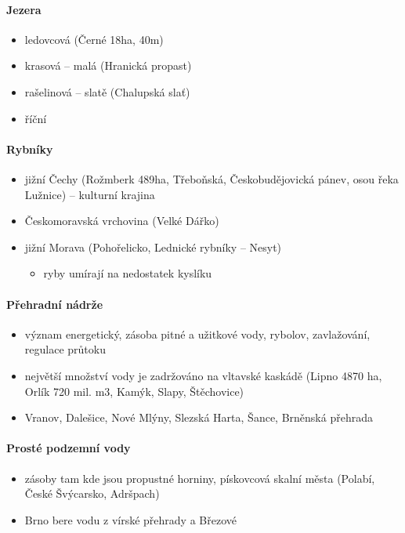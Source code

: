 \paragraph{Jezera}
\begin{itemize}
\item ledovcová (Černé 18ha, 40m)
\item krasová -- malá (Hranická propast)
\item rašelinová -- slatě (Chalupská slať)
\item říční	
\end{itemize}

\paragraph{Rybníky}
\begin{itemize}
\item jižní Čechy (Rožmberk 489ha, Třeboňská, Českobudějovická pánev, osou řeka Lužnice) -- kulturní krajina
\item Českomoravská vrchovina (Velké Dářko)
\item jižní Morava (Pohořelicko, Lednické rybníky -- Nesyt)
	\begin{itemize}
	\item ryby umírají na nedostatek kyslíku
	\end{itemize}
\end{itemize}

\paragraph{Přehradní nádrže}
\begin{itemize}
\item význam energetický, zásoba pitné a užitkové vody, rybolov, zavlažování, regulace průtoku
\item největší množství vody je zadržováno na vltavské kaskádě (Lipno 4870 ha, Orlík 720 mil. m3, Kamýk, Slapy, Štěchovice)
\item Vranov, Dalešice, Nové Mlýny, Slezská Harta, Šance, Brněnská přehrada
\end{itemize}

\paragraph{Prosté podzemní vody}
\begin{itemize}
\item zásoby tam kde jsou propustné horniny, pískovcová skalní města (Polabí, České Švýcarsko, Adršpach)
\item Brno bere vodu z vírské přehrady a Březové
\end{itemize}

